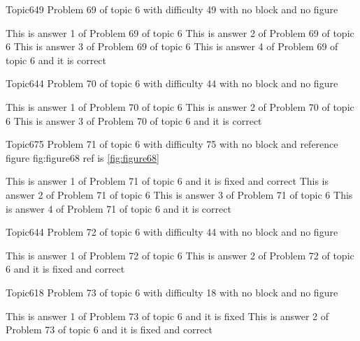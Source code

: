 \documentclass[master]{exam}
\begin{document}
\begin{problem}{Topic6}{49}
	Problem 69 of topic 6 with difficulty 49 with no block and no figure
	\begin{answers}
		\answer This is answer 1 of Problem 69 of topic 6 
		\answer This is answer 2 of Problem 69 of topic 6 
		\answer This is answer 3 of Problem 69 of topic 6 
		\answer[correct] This is answer 4 of Problem 69 of topic 6 and it is correct
	\end{answers}
\end{problem}

\begin{problem}{Topic6}{44}
	Problem 70 of topic 6 with difficulty 44 with no block and no figure
	\begin{answers}
		\answer This is answer 1 of Problem 70 of topic 6 
		\answer This is answer 2 of Problem 70 of topic 6 
		\answer[correct] This is answer 3 of Problem 70 of topic 6 and it is correct
	\end{answers}
\end{problem}

\begin{problem}{Topic6}{75}
	Problem 71 of topic 6 with difficulty 75 with no block and reference figure fig:figure68 ref is \ref{fig:figure68}
	\begin{answers}
		 This is answer 1 of Problem 71 of topic 6 and it is fixed and correct
		\answer This is answer 2 of Problem 71 of topic 6 
		\answer This is answer 3 of Problem 71 of topic 6 
		\answer[correct] This is answer 4 of Problem 71 of topic 6 and it is correct
	\end{answers}
\end{problem}

\begin{problem}{Topic6}{44}
	Problem 72 of topic 6 with difficulty 44 with no block and no figure
	\begin{answers}
		\answer This is answer 1 of Problem 72 of topic 6 
		 This is answer 2 of Problem 72 of topic 6 and it is fixed and correct
	\end{answers}
\end{problem}

\begin{problem}{Topic6}{18}
	Problem 73 of topic 6 with difficulty 18 with no block and no figure
	\begin{answers}
		\answer[fixed] This is answer 1 of Problem 73 of topic 6 and it is fixed
		 This is answer 2 of Problem 73 of topic 6 and it is fixed and correct
	\end{answers}
\end{problem}
\end{document}
